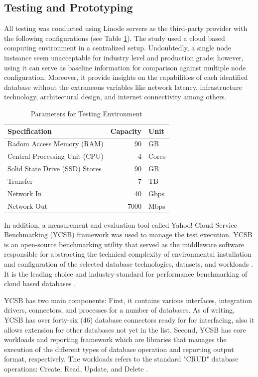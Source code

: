 \documentclass[5p]{elsarticle}
\begin{document}
\begin{enumerate}
\end{enumerate}

\subsection{Testing and Prototyping}
All testing was conducted using Linode servers as the third-party provider with the following configurations (see Table \ref{table.cloud.environment}). 
The study used a cloud based computing environment in a centralized setup. 
Undoubtedly, a single node instsance seem unacceptable for industry level and production grade; 
however, using it can serve as baseline information for comparison against multiple node configuration. 
Moreover, it provide insights on the capabilities of each identified database without the extraneous variables like network latency, infrastructure technology, architectural design, and internet connectivity among others. 
 

\begin{table}[ht]
    \centering
    \caption{Parameters for Testing Environment}
     \label{table.cloud.environment}
        \begin{tabular}{lrl}
        \toprule
        Specification &  Capacity & Unit \\
        \hline
        Radom Access Memory (RAM)  & 90 &GB \\
        Central Processing Unit (CPU)  & 4 &Cores \\
        Solid State Drive (SSD) Stores  & 90 &GB \\
        Transfer &  7 &TB \\
        Network In &  40 &Gbps \\
        Network Out &  7000 &Mbps \\
        \hline
    \end{tabular}
\end{table}

In addition, a measurement and evaluation tool called Yahoo! Cloud Service Benchmarking (YCSB) framework was used to manage the test execution.
YCSB is an open-source benchmarking utility that served as the middleware software responsible for abstracting the technical complexity of environmental installation and configuration of the selected database technologies, datasets, and workloads \cite{B.F.Cooper2010143}.
It is the leading choice and industry-standard for performance benchmarking of cloud based databases \cite{Patil11ycsb++:benchmarking}.

YCSB has two main components: First, it contains various interfaces, integration drivers, connectors, and processes for a number of databases. 
As of writing, YCSB has over forty-six (46) database connectors ready for for interfacing, also it allows extension for other databases not yet in the list. 
Second, YCSB has core workloads and reporting framework which are libraries that manages the execution of the different types of database operation and reporting output format, respectively.
The workloads refers to the standard "CRUD" database operations: Create, Read, Update, and Delete \cite{B.F.Cooper2010143}.
\end{document}
